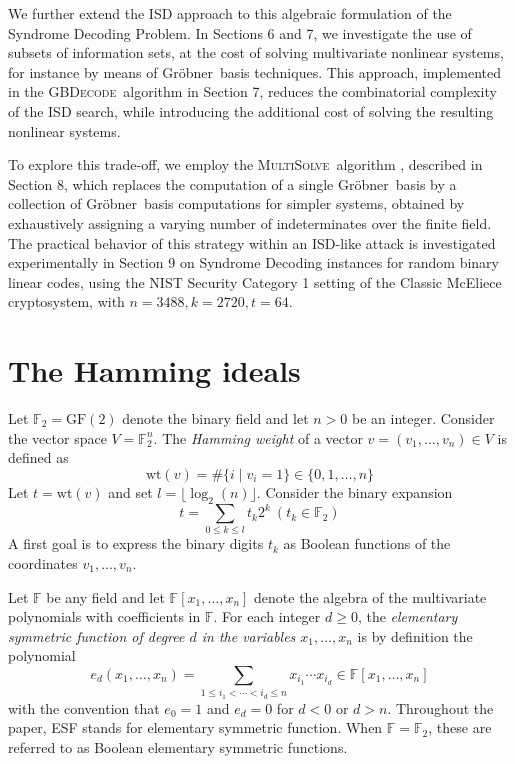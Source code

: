 \documentclass{amsart}
\def\FF{{\mathbb F}}
\def\Gr{Gr\"obner}
\def\GF{{\mathrm{GF}}}
\def\wt{{\mathrm{wt}}}
\def\MultiSolve{{\textsc{MultiSolve}}}
\def\GBDecode{{\textsc{GBDecode}}}
\begin{document}
We further extend the ISD approach to this algebraic formulation of the Syndrome
Decoding Problem. In Sections 6 and 7, we investigate the use of subsets of information
sets, at the cost of solving multivariate nonlinear systems, for instance by means
of \Gr\ basis techniques. This approach, implemented in the \GBDecode\ algorithm in Section 7,
reduces the combinatorial complexity of the ISD search, while introducing the additional
cost of solving the resulting nonlinear systems.

To explore this trade-off, we employ the \MultiSolve\ algorithm \cite{LSPTV,LST}, described
in Section 8, which replaces the computation of a single \Gr\ basis by a collection of \Gr\ basis
computations for simpler systems, obtained by exhaustively assigning a varying number
of indeterminates over the finite field. The practical behavior of this strategy within
an ISD-like attack is investigated experimentally in Section 9 on Syndrome Decoding instances
for random binary linear codes, using the NIST Security Category 1 setting of the Classic McEliece
cryptosystem, with $n = 3488, k = 2720, t = 64$.




\section{The Hamming ideals}

Let $\FF_2 = \GF(2)$ denote the binary field and let $n > 0$ be an integer.
Consider the vector space $V = \FF_2^n$. The {\em Hamming weight} of
a vector $v = (v_1,\ldots,v_n)\in V$ is defined as
\[
\wt(v) = \# \{i \mid v_i = 1\}\in\{0,1,\ldots,n\}
\]
Let $t = \wt(v)$ and set $l = \lfloor \log_2(n) \rfloor$. Consider
the binary expansion
\[
t = \sum_{0\leq k\leq l} t_k 2^k\ (t_k\in\FF_2)
\]
A first goal is to express the binary digits $t_k$ as Boolean functions of the coordinates
$v_1,\ldots,v_n$.

Let $\FF$ be any field and let $\FF[x_1,\ldots,x_n]$ denote the algebra
of the multivariate polynomials with coefficients in $\FF$.
For each integer $d\geq 0$, the {\em elementary symmetric function
of degree $d$ in the variables $x_1,\ldots,x_n$} is by definition the polynomial
\[
e_d(x_1,\ldots,x_n) =
\sum_{1 \le i_1 < \cdots < i_d \le n} x_{i_1}\cdots x_{i_d}\in \FF[x_1,\ldots,x_n]
\]
with the convention that $e_0 = 1$ and $e_d = 0$ for $d < 0$ or $d > n$. Throughout the paper,
ESF stands for elementary symmetric function. When $\FF = \mathbb{F}_2$, these are
referred to as Boolean elementary symmetric functions.
\end{document}
